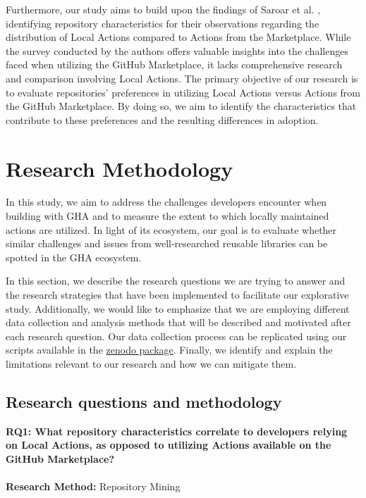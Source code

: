 \documentclass[conference]{IEEEtran}
\begin{document}
	Furthermore, our study aims to build upon the findings of Saroar et al. \cite{saroar2023developers}, identifying repository characteristics for their observations regarding the distribution of Local Actions compared to Actions from the Marketplace. While the survey conducted by the authors offers valuable insights into the challenges faced when utilizing the GitHub Marketplace, it lacks comprehensive research and comparison involving Local Actions. The primary objective of our research is to evaluate repositories' preferences in utilizing Local Actions versus Actions from the GitHub Marketplace. By doing so, we aim to identify the characteristics that contribute to these preferences and the resulting differences in adoption.





\section{Research Methodology}
    In this study, we aim to address the challenges developers encounter when building with GHA and to measure the extent to which locally maintained actions are utilized. In light of its ecosystem, our goal is to evaluate whether similar challenges and issues from well-researched reusable libraries can be spotted in the GHA ecosystem.


In this section, we describe the research questions we are trying to answer and the research strategies that have been implemented to facilitate our explorative study. Additionally, we would like to emphasize that we are employing different data collection and analysis methods that will be described and motivated after each research question. Our data collection process can be replicated using our scripts available in the \href{https://doi.org/10.5281/zenodo.11268782} {zenodo package}\cite{Marof2024}. Finally, we identify and explain the limitations relevant to our research and how we can mitigate them. 

    \subsection{Research questions and methodology}
        \textbf{RQ1: What repository characteristics correlate to developers relying on Local Actions, as opposed to utilizing Actions available on the GitHub Marketplace?}\\\\
 \textbf{Research Method:}  Repository Mining 
\end{document}
